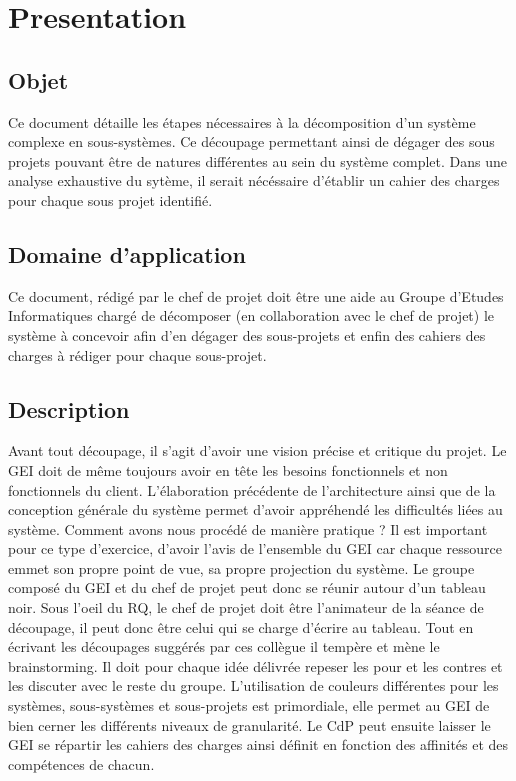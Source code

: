 \section{Presentation}
\subsection{Objet}
Ce document détaille les étapes nécessaires à la décomposition d'un système complexe en sous-systèmes. Ce découpage permettant ainsi de dégager des sous projets pouvant être de natures différentes au sein du système complet. Dans une analyse exhaustive du sytème, il serait nécéssaire d'établir un cahier des charges pour chaque sous projet identifié.
\medskip

\subsection{Domaine d'application}
Ce document, rédigé par le chef de projet doit être une aide au Groupe d'Etudes Informatiques chargé de décomposer (en collaboration avec le chef de projet) le système à concevoir afin d'en dégager des sous-projets et enfin des cahiers des charges à rédiger pour chaque sous-projet.
\subsection{Description}
Avant tout découpage, il s'agit d'avoir une vision précise et critique du projet. Le GEI doit de même toujours avoir en tête les besoins fonctionnels et non fonctionnels du client. L'élaboration précédente de l'architecture  ainsi que de la conception générale du système permet d'avoir appréhendé les difficultés liées au système. 
\medskip
Comment avons nous procédé de manière pratique ?
\medskip
Il est important pour ce type d'exercice, d'avoir l'avis de l'ensemble du GEI car chaque ressource emmet son propre point de vue, sa propre \og projection \fg du système. Le groupe composé du GEI et du chef de projet peut donc se réunir autour d'un tableau noir. Sous l'oeil du RQ, le chef de projet doit être l'animateur de la séance de découpage, il peut donc être celui qui se charge d'écrire au tableau. Tout en écrivant les découpages suggérés par ces collègue il tempère et mène le brainstorming. Il doit pour chaque idée délivrée repeser les pour et les contres et les discuter avec le reste du groupe. L'utilisation de couleurs différentes pour les systèmes, sous-systèmes et sous-projets est primordiale, elle permet au GEI de bien cerner les différents niveaux de granularité. Le CdP peut ensuite laisser le GEI se répartir les cahiers des charges ainsi définit en fonction des affinités et des compétences de chacun.
